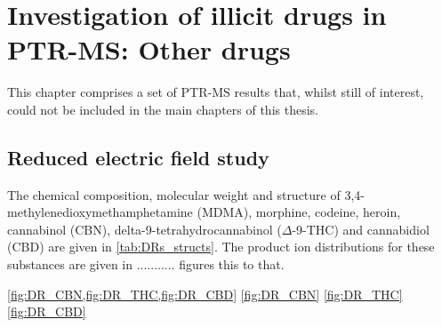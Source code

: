 \chapter{Investigation of illicit drugs in PTR-MS: Other drugs}\label{chapter:drugs}

This chapter comprises a set of PTR-MS results that, whilst still of interest, could not be included in the main chapters of this thesis.


\section{Reduced electric field study}
The chemical composition, molecular weight and structure of 
3,4-methylenedioxymethamphetamine (MDMA),
morphine, 
codeine, 
heroin, 
cannabinol (CBN), 
delta-9-tetrahydrocannabinol ($\Delta$-9-THC)
and 
cannabidiol (CBD)
are given in \autoref{tab:DRs_structs}.
%
The product ion distributions for these substances are given in ........... figures this to that.

\ref{fig:DR_CBN,fig:DR_THC,fig:DR_CBD}
\autoref{fig:DR_CBN}
\autoref{fig:DR_THC}
\autoref{fig:DR_CBD}


